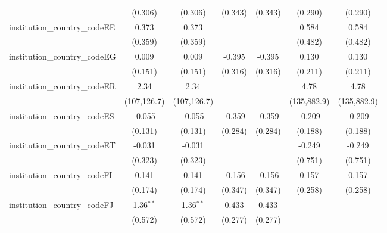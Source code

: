 \begin{tabular}{lcccccc}
                                         & (0.306)        & (0.306)        & (0.343)        & (0.343)        & (0.290)        & (0.290)\\   
   institution\_country\_codeEE          & 0.373          & 0.373          &                &                & 0.584          & 0.584\\   
                                         & (0.359)        & (0.359)        &                &                & (0.482)        & (0.482)\\   
   institution\_country\_codeEG          & 0.009          & 0.009          & -0.395         & -0.395         & 0.130          & 0.130\\   
                                         & (0.151)        & (0.151)        & (0.316)        & (0.316)        & (0.211)        & (0.211)\\   
   institution\_country\_codeER          & 2.34           & 2.34           &                &                & 4.78           & 4.78\\   
                                         & (107,126.7)    & (107,126.7)    &                &                & (135,882.9)    & (135,882.9)\\   
   institution\_country\_codeES          & -0.055         & -0.055         & -0.359         & -0.359         & -0.209         & -0.209\\   
                                         & (0.131)        & (0.131)        & (0.284)        & (0.284)        & (0.188)        & (0.188)\\   
   institution\_country\_codeET          & -0.031         & -0.031         &                &                & -0.249         & -0.249\\   
                                         & (0.323)        & (0.323)        &                &                & (0.751)        & (0.751)\\   
   institution\_country\_codeFI          & 0.141          & 0.141          & -0.156         & -0.156         & 0.157          & 0.157\\   
                                         & (0.174)        & (0.174)        & (0.347)        & (0.347)        & (0.258)        & (0.258)\\   
   institution\_country\_codeFJ          & 1.36$^{**}$    & 1.36$^{**}$    & 0.433          & 0.433          &                &   \\   
                                         & (0.572)        & (0.572)        & (0.277)        & (0.277)        &                &   \\   

\end{tabular}
